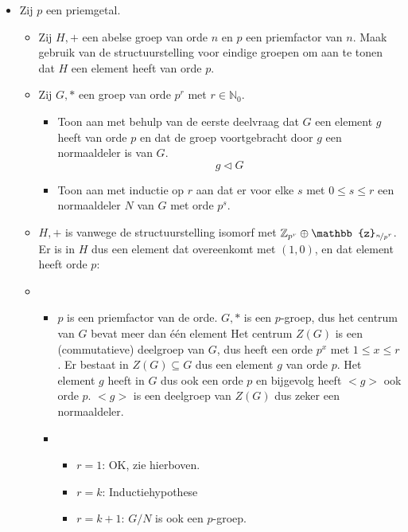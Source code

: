 \documentclass[main.tex]{subfiles}
\begin{document}
\begin{itemize}
\item 
  Zij $p$ een priemgetal.
  \begin{itemize}
  \item Zij $H,+$ een abelse groep van orde $n$ en $p$ een priemfactor van $n$.
    Maak gebruik van de structuurstelling voor eindige groepen om aan te tonen dat $H$ een element heeft van orde $p$.
  \item Zij $G,*$ een groep van orde $p^{r}$ met $r\in \mathbb{N}_{0}$.
    \begin{itemize}
    \item Toon aan met behulp van de eerste deelvraag dat $G$ een element $g$ heeft van orde $p$ en dat de groep voortgebracht door $g$ een normaaldeler is van $G$.
      \[ g \triangleleft G \]
    \item 
      Toon aan met inductie op $r$ aan dat er voor elke $s$ met $0\le s \le r$ een normaaldeler $N$ van $G$ met orde $p^{s}$.
    \end{itemize}
  \end{itemize}
  \begin{itemize}
  \item $H,+$ is vanwege de structuurstelling isomorf met
    $\mathbb{Z}_{p^{r}} \oplus \mathbb{z}_{\nicefrac{n}{p^{r}}}$.  Er
    is in $H$ dus een element dat overeenkomt met $(1,0)$, en dat
    element heeft orde $p$:
  \item
    \begin{itemize}
    \item $p$ is een priemfactor van de orde.
      $G,*$ is een $p$-groep, dus het centrum van $G$ bevat meer dan \'e\'en element
      Het centrum $Z(G)$ is een (commutatieve) deelgroep van $G$, dus heeft een orde $p^{x}$ met $1\le x\le r$.
      Er bestaat in $Z(G) \subseteq G$ dus een element $g$ van orde $p$.
      Het element $g$ heeft in $G$ dus ook een orde $p$ en bijgevolg heeft $<g>$ ook orde $p$.
      $<g>$ is een deelgroep van $Z(G)$ dus zeker een normaaldeler.
    \item 
      \begin{itemize}
      \item $r = 1$: OK, zie hierboven.
      \item $r = k$: Inductiehypothese
      \item $r = k+1$:
        $G/N$ is ook een $p$-groep.
      \end{itemize}
    \end{itemize}
  \end{itemize}

\end{itemize}
\end{document}
